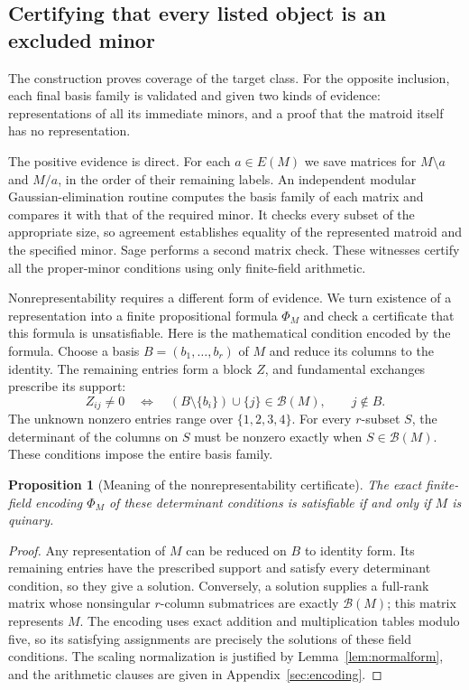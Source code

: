 \documentclass[11pt,a4paper]{article}
\newtheorem{proposition}[theorem]{Proposition}
\theoremstyle{definition}
\newcommand{\B}{\mathcal B}
\begin{document}
\subsection{Certifying that every listed object is an excluded minor}

The construction proves coverage of the target class. For the
opposite inclusion, each final basis family is validated and
given two kinds of evidence: representations of all its immediate
minors, and a proof that the matroid itself has no representation.

The positive evidence is direct. For each $a\in E(M)$ we save
matrices for $M\setminus a$ and $M/a$, in the order of their
remaining labels. An independent modular Gaussian-elimination
routine computes the basis family of each matrix and compares
it with that of the required minor. It checks every subset of
the appropriate size, so agreement establishes equality of the
represented matroid and the specified minor. Sage performs a
second matrix check. These witnesses certify all the proper-minor
conditions using only finite-field arithmetic.

Nonrepresentability requires a different form of evidence. We
turn existence of a representation into a finite propositional
formula $\Phi_M$ and check a certificate that this formula is
unsatisfiable. Here is the mathematical condition encoded by
the formula. Choose a basis $B=(b_1,\ldots,b_r)$ of $M$ and
reduce its columns to the identity. The remaining entries form
a block $Z$, and fundamental exchanges prescribe its support:
\[
 Z_{ij}\ne0\quad\Longleftrightarrow\quad
 (B\setminus\{b_i\})\cup\{j\}\in\B(M),\qquad j\notin B.
\]
The unknown nonzero entries range over $\{1,2,3,4\}$. For every
$r$-subset $S$, the determinant of the columns on $S$ must be
nonzero exactly when $S\in\B(M)$. These conditions impose the
entire basis family.

\begin{proposition}[Meaning of the nonrepresentability certificate]\label{prop:certificate}
The exact finite-field encoding $\Phi_M$ of these determinant
conditions is satisfiable if and only if $M$ is quinary.
\end{proposition}
\begin{proof}
Any representation of $M$ can be reduced on $B$ to identity form.
Its remaining entries have the prescribed support and satisfy
every determinant condition, so they give a solution. Conversely,
a solution supplies a full-rank matrix whose nonsingular
$r$-column submatrices are exactly $\B(M)$; this matrix represents
$M$. The encoding uses exact addition and multiplication tables
modulo five, so its satisfying assignments are precisely the
solutions of these field conditions. The scaling normalization is
justified by Lemma~\ref{lem:normalform}, and the arithmetic clauses
are given in Appendix~\ref{sec:encoding}.
\end{proof}
\end{document}

